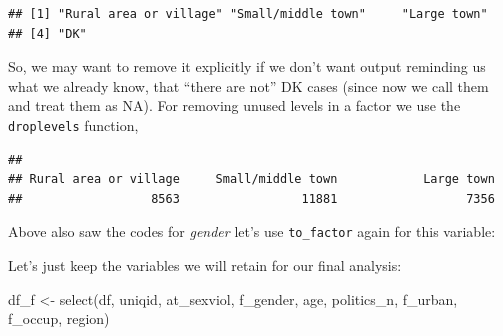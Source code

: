 \documentclass[
]{book}
\newenvironment{Shaded}{\begin{snugshade}}{\end{snugshade}}
\newcommand{\FunctionTok}[1]{\textcolor[rgb]{0.00,0.00,0.00}{#1}}
\newcommand{\NormalTok}[1]{#1}
\newcommand{\OtherTok}[1]{\textcolor[rgb]{0.56,0.35,0.01}{#1}}
\newcommand{\SpecialCharTok}[1]{\textcolor[rgb]{0.00,0.00,0.00}{#1}}
\begin{document}
\begin{Shaded}
\end{Shaded}

\begin{verbatim}
## [1] "Rural area or village" "Small/middle town"     "Large town"           
## [4] "DK"
\end{verbatim}

So, we may want to remove it explicitly if we don't want output reminding us what we already know, that ``there are not'' DK cases (since now we call them and treat them as NA). For removing unused levels in a factor we use the \texttt{droplevels} function,

\begin{Shaded}
\end{Shaded}

\begin{verbatim}
## 
## Rural area or village     Small/middle town            Large town 
##                  8563                 11881                  7356
\end{verbatim}

Above also saw the codes for \emph{gender} let's use \texttt{to\_factor} again for this variable:

\begin{Shaded}
\end{Shaded}

Let's just keep the variables we will retain for our final analysis:

\begin{Shaded}
\begin{Highlighting}[]
\NormalTok{df\_f }\OtherTok{\textless{}{-}} \FunctionTok{select}\NormalTok{(df, uniqid, at\_sexviol, f\_gender, age, politics\_n,}
\NormalTok{               f\_urban, f\_occup, region)}
\end{Highlighting}
\end{Shaded}
\end{document}
